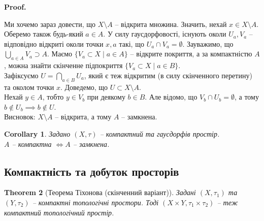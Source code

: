 \documentclass[a4paper, 10pt]{article}
\makeatletter
\theoremstyle{theoremdd}
\newtheorem{theorem}{Theorem}[subsection]
\newtheorem{corollary}[theorem]{Corollary}
\renewenvironment{proof}[1][Proof.\\]{\par
\pushQED{\hfill \qed}%
\normalfont \topsep6\p@\@plus6\p@\relax
\trivlist
\item\relax
{\bfseries
#1\@addpunct{.}}\hspace\labelsep\ignorespaces
}{%
\popQED\endtrivlist\@endpefalse
}
\makeatother
\begin{document}
\begin{proof}
Ми хочемо зараз довести, що $X \setminus A$ -- відкрита множина. Значить, нехай $x \in X \setminus A$. Оберемо також будь-який $a \in A$. У силу гаусдорфовості, існують околи $U_a,V_a$ -- відповідно відкриті околи точки $x,a$ такі, що $U_a \cap V_a = \emptyset$. Зауважимо, що $\displaystyle\bigcup_{a \in A} V_a \supset A$. Маємо $\{V_a \subset X\mid a \in A\}$ -- відкрите покриття, а за компактністю $A$, можна знайти скінченне підпокриття $\{V_a \subset X\mid a \in B\}$.\\
Зафіксуємо $U = \displaystyle\bigcap_{a \in B} U_a$, який є теж відкритим (в силу скінченного перетину) та околом точки $x$. Доведемо, що $U \subset X \setminus A$.\\
Нехай $y \in A$, тобто $y \in V_b$ при деякому $b \in B$. Але відомо, що $V_b \cap U_b = \emptyset$, а тому $b \notin U_b \implies b \notin U$.\\
Висновок: $X \setminus A$ -- відкрита, а тому $A$ -- замкнена.
\end{proof}

\begin{corollary}
Задано $(X,\tau)$ -- компактний та гаусдорфів простір.\\
$A$ -- компактна $\iff A$ -- замкнена.
\end{corollary}

\subsection{Компактність та добуток просторів}
\begin{theorem}[Теорема Тіхонова (скінченний варіант)]
Задані $(X,\tau_1)$ та $(Y,\tau_2)$ -- компактні топологічні простори. Тоді $(X \times Y, \tau_1 \times \tau_2)$ -- теж компактний топологічний простір.
\end{theorem}
\end{document}
